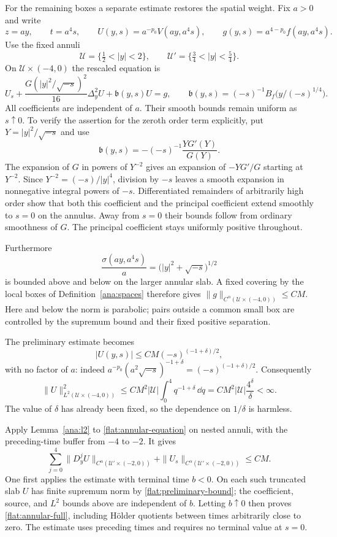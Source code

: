 For the remaining boxes a separate estimate restores the spatial
weight. Fix $a>0$ and write
\[
 z=ay,\qquad t=a^4s,\qquad
 U(y,s)=a^{-p_0}V(ay,a^4s),\qquad
 g(y,s)=a^{4-p_0}f(ay,a^4s).
\]
Use the fixed annuli
\[
 \mathcal U=\{\tfrac12<|y|<2\},\qquad
 \mathcal U'=\{\tfrac34<|y|<\tfrac54\}.
\]
On $\mathcal U\times(-4,0)$ the rescaled equation is
\begin{equation}\label{flat:annular-equation}
 U_s+\frac{G(|y|^2/\sqrt{-s})^2}{16}\Delta_y^2U
      +\mathfrak b(y,s)U=g,\qquad
 \mathfrak b(y,s)=(-s)^{-1}
                     B_f\bigl(y/(-s)^{1/4}\bigr).
\end{equation}
All coefficients are independent of $a$. Their smooth bounds remain
uniform as $s\uparrow0$. To verify the assertion for the zeroth order
term explicitly, put $Y=|y|^2/\sqrt{-s}$ and use
\[
 \mathfrak b(y,s)=-(-s)^{-1}\frac{YG'(Y)}{G(Y)}.
\]
The expansion of $G$ in powers of $Y^{-2}$ gives an expansion of
$-YG'/G$ starting at $Y^{-2}$. Since
$Y^{-2}=(-s)/|y|^4$, division by $-s$ leaves a smooth expansion in
nonnegative integral powers of $-s$. Differentiated remainders of
arbitrarily high order show that both this coefficient and the
principal coefficient extend smoothly to $s=0$ on the annulus.
Away from $s=0$ their bounds follow from ordinary smoothness of $G$.
The principal coefficient stays uniformly positive throughout.

Furthermore
\[
 \frac{\sigma(ay,a^4s)}a
       =\bigl(|y|^2+\sqrt{-s}\bigr)^{1/2}
\]
is bounded above and below on the larger annular slab. A fixed
covering by the local boxes of Definition~\ref{ana:spaces} therefore
gives $\|g\|_{C^\alpha(\mathcal U\times(-4,0))}\le CM$.
Here and below the norm is parabolic; pairs outside a common small
box are controlled by the supremum bound and their fixed positive
separation.

The preliminary estimate becomes
\[
 |U(y,s)|\le CM(-s)^{(-1+\delta)/2},
\]
with no factor of $a$: indeed
$a^{-p_0}(a^2\sqrt{-s})^{-1+\delta}
=(-s)^{(-1+\delta)/2}$. Consequently
\begin{equation}\label{flat:annular-l2}
 \|U\|_{L^2(\mathcal U\times(-4,0))}^2
 \le C M^2|\mathcal U|\int_0^4 q^{-1+\delta}\,\dd q
 =C M^2|\mathcal U|\frac{4^\delta}{\delta}<\infty.
\end{equation}
The value of $\delta$ has already been fixed, so the dependence on
$1/\delta$ is harmless.

Apply Lemma~\ref{ana:l2} to \eqref{flat:annular-equation} on nested
annuli, with the preceding-time buffer from $-4$ to $-2$. It gives
\begin{equation}\label{flat:annular-full}
 \sum_{j=0}^4\|D_y^jU\|_{C^\alpha(\mathcal U'\times(-2,0))}
 +\|U_s\|_{C^\alpha(\mathcal U'\times(-2,0))}
 \le CM.
\end{equation}
One first applies the estimate with terminal time $b<0$. On each
such truncated slab $U$ has finite supremum norm by
\eqref{flat:preliminary-bound}; the coefficient, source, and $L^2$
bounds above are independent of $b$. Letting $b\uparrow0$ then
proves \eqref{flat:annular-full}, including H\"older quotients between
times arbitrarily close to zero. The estimate uses preceding times
and requires no terminal value at $s=0$.

